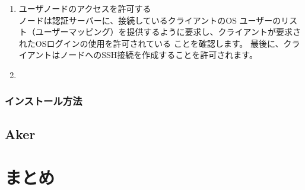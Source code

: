 \documentclass[12pt,a4paper,titlepage]{jsarticle}
\begin{document}
\begin{enumerate}[1:]
    \item ユーザノードのアクセスを許可する\mbox{}\\ノードは認証サーバーに、接続しているクライアントのOS
    ユーザーのリスト（ユーザーマッピング）を提供するように要求し、クライアントが要求されたOSログインの使用を許可されている
    ことを確認します。
    最後に、クライアントはノードへのSSH接続を作成することを許可されます。
    \item \mbox{}\\
\end{enumerate}


\subsubsection*{インストール方法}




\subsection{Aker}

\section{まとめ}
\end{document}
